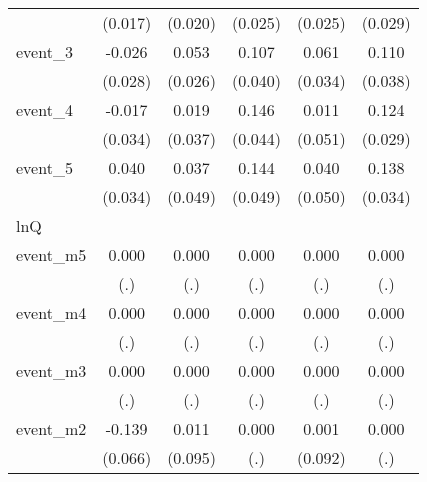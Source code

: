 {\begin{tabular}{l*{5}{c}}
            &     (0.017)         &     (0.020)         &     (0.025)         &     (0.025)         &     (0.029)         \\
[1em]
event\_3     &      -0.026         &       0.053\sym{*}  &       0.107\sym{**} &       0.061         &       0.110\sym{**} \\
            &     (0.028)         &     (0.026)         &     (0.040)         &     (0.034)         &     (0.038)         \\
[1em]
event\_4     &      -0.017         &       0.019         &       0.146\sym{***}&       0.011         &       0.124\sym{***}\\
            &     (0.034)         &     (0.037)         &     (0.044)         &     (0.051)         &     (0.029)         \\
[1em]
event\_5     &       0.040         &       0.037         &       0.144\sym{**} &       0.040         &       0.138\sym{***}\\
            &     (0.034)         &     (0.049)         &     (0.049)         &     (0.050)         &     (0.034)         \\
\hline
lnQ         &                     &                     &                     &                     &                     \\
event\_m5    &       0.000         &       0.000         &       0.000         &       0.000         &       0.000         \\
            &         (.)         &         (.)         &         (.)         &         (.)         &         (.)         \\
[1em]
event\_m4    &       0.000         &       0.000         &       0.000         &       0.000         &       0.000         \\
            &         (.)         &         (.)         &         (.)         &         (.)         &         (.)         \\
[1em]
event\_m3    &       0.000         &       0.000         &       0.000         &       0.000         &       0.000         \\
            &         (.)         &         (.)         &         (.)         &         (.)         &         (.)         \\
[1em]
event\_m2    &      -0.139\sym{*}  &       0.011         &       0.000         &       0.001         &       0.000         \\
            &     (0.066)         &     (0.095)         &         (.)         &     (0.092)         &         (.)         \\

\end{tabular}}
